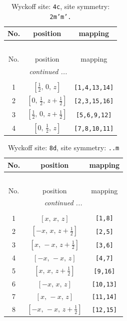 \documentclass[fleqn,8pt]{jsarticle}
\begin{document}
\renewcommand{\arraystretch}{1.2}
\begin{longtable}{ccc}
\caption{Wyckoff site: {\tt 4c}, site symmetry: {\tt 2m'm'.}}
 \\
 \hline \hline
No. & position & mapping \\ \hline \endfirsthead

\multicolumn{2}{l}{\tablename\ \thetable{}} \\
 \hline \hline
No. & position & mapping \\ \hline \endhead

 \hline \hline
\multicolumn{2}{r}{\footnotesize\it continued ...} \\ \endfoot

 \hline \hline
\multicolumn{2}{r}{} \\ \endlastfoot

1 & $\left[ \frac{1}{2},\, 0,\, z \right]$ & {\tt [1,4,13,14]} \\ \hline
2 & $\left[ 0,\, \frac{1}{2},\, z + \frac{1}{2} \right]$ & {\tt [2,3,15,16]} \\ \hline
3 & $\left[ \frac{1}{2},\, 0,\, z + \frac{1}{2} \right]$ & {\tt [5,6,9,12]} \\ \hline
4 & $\left[ 0,\, \frac{1}{2},\, z \right]$ & {\tt [7,8,10,11]} \\
\end{longtable}
\renewcommand{\arraystretch}{1.2}
\begin{longtable}{ccc}
\caption{Wyckoff site: {\tt 8d}, site symmetry: {\tt ..m}}
 \\
 \hline \hline
No. & position & mapping \\ \hline \endfirsthead

\multicolumn{2}{l}{\tablename\ \thetable{}} \\
 \hline \hline
No. & position & mapping \\ \hline \endhead

 \hline \hline
\multicolumn{2}{r}{\footnotesize\it continued ...} \\ \endfoot

 \hline \hline
\multicolumn{2}{r}{} \\ \endlastfoot

1 & $\left[ x,\, x,\, z \right]$ & {\tt [1,8]} \\ \hline
2 & $\left[ - x,\, x,\, z + \frac{1}{2} \right]$ & {\tt [2,5]} \\ \hline
3 & $\left[ x,\, - x,\, z + \frac{1}{2} \right]$ & {\tt [3,6]} \\ \hline
4 & $\left[ - x,\, - x,\, z \right]$ & {\tt [4,7]} \\ \hline
5 & $\left[ x,\, x,\, z + \frac{1}{2} \right]$ & {\tt [9,16]} \\ \hline
6 & $\left[ - x,\, x,\, z \right]$ & {\tt [10,13]} \\ \hline
7 & $\left[ x,\, - x,\, z \right]$ & {\tt [11,14]} \\ \hline
8 & $\left[ - x,\, - x,\, z + \frac{1}{2} \right]$ & {\tt [12,15]} \\
\end{longtable}
\end{document}
